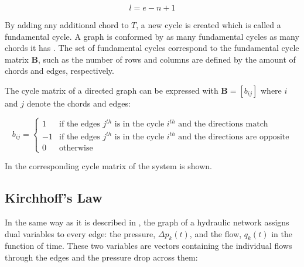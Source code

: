 \begin{equation}
  \label{Numberofchords}
  l = e - n +1
\end{equation}

By adding any additional chord to $T$, a new cycle is created which is called a fundamental cycle. A graph is conformed by as many fundamental cycles as many chords it has \cite{GraphModel}.  
The set of fundamental cycles correspond to the fundamental cycle matrix $\pmb{B}$, such as the number of rows and columns are defined by the amount of chords and edges, respectively. 

The cycle matrix of a directed graph can be expressed with $\pmb{B} = [b_{ij}]$ where $i$ and $j$ denote the chords and edges:

\begin{equation}
\label{DiGraphCycle}
 b_{ij} =
		\left\{
		\begin{array}{ll}
		
		1 			&      \text{if the edges $j^{th}$ is in the cycle $i^{th}$ and the directions match}	
\\
		-1                       &     \text{if the edges $j^{th}$ is in the cycle $i^{th}$ and the directions are opposite}
\\

                0                       &      \text{otherwise}

		\end{array}
		\right.
\end{equation}	

In  the corresponding cycle matrix of the system is 
shown.

\subsection{Kirchhoff's Law}
\label{KirchhoffSection}

In the same way as it is described in , the graph of a hydraulic network assigns dual variables to every edge: 
the pressure, $\Delta p_k(t)$, and the flow, $q_k(t)$ in the function of time. These two variables are vectors containing the individual flows through the edges and 
the pressure drop across them:


